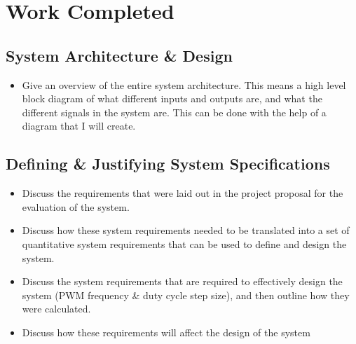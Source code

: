 \chapter{Work Completed}\label{C:work}

\section{System Architecture \& Design}

\begin{itemize}
    
    \begin{figure}[H]
        \texttt{[image: System\_Overview.png]}
        \caption{High level system overview}
        \label{F:sys_overview}
    \end{figure}

    \item 
    Give an overview of the entire system architecture. This means a high level block diagram of what different inputs and outputs are, and what the different signals in the system are. This can be done with the help of a diagram that I will create. 
    

\end{itemize}

\section{Defining \& Justifying System Specifications}

\begin{itemize}

    \item 
    Discuss the requirements that were laid out in the project proposal for the evaluation of the system. 

    \item 
    Discuss how these system requirements needed to be translated into a set of quantitative system requirements that can be used to define and design the system.
    
    \item 
    Discuss the system requirements that are required to effectively design the system (PWM frequency \& duty cycle step size), and then outline how they were calculated.
    
    \item 
    Discuss how these requirements will affect the design of the system

\end{itemize}

